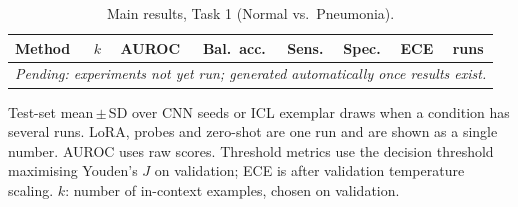 \begin{table}[t]
\centering
\scriptsize
\caption{Main results, Task 1 (Normal vs.\ Pneumonia).}
\label{tab:main_task1}
\begin{tabular}{lccccccc}
\toprule
Method & $k$ & AUROC & Bal.\ acc. & Sens. & Spec. & ECE & runs\\
\midrule
\multicolumn{8}{l}{\textit{Pending: experiments not yet run; generated automatically once results exist.}}\\
\bottomrule
\end{tabular}
\par\vspace{2pt}\footnotesize Test-set mean\,$\pm$\,SD over CNN seeds or ICL exemplar draws when a condition has several runs. LoRA, probes and zero-shot are one run and are shown as a single number. AUROC uses raw scores. Threshold metrics use the decision threshold maximising Youden's $J$ on validation; ECE is after validation temperature scaling. $k$: number of in-context examples, chosen on validation.
\end{table}
